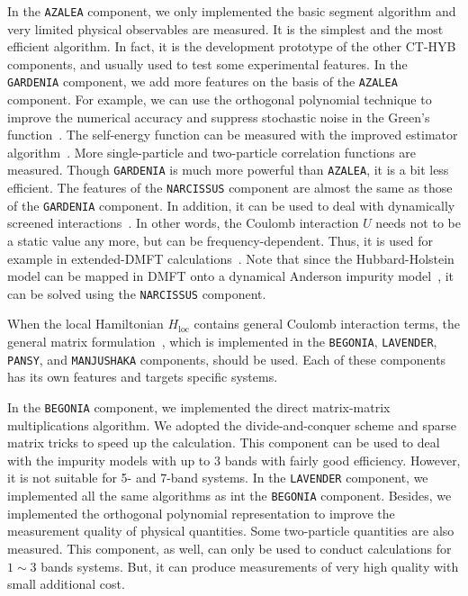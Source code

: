 In the \texttt{AZALEA} component, we only implemented the basic segment algorithm and very limited physical observables are measured. It is the simplest and the most efficient algorithm. In fact, it is the development prototype of the other CT-HYB components, and usually used to test some experimental features. In the \texttt{GARDENIA} component, we add more features on the basis of the \texttt{AZALEA} component. For example, we can use the orthogonal polynomial technique to improve the numerical accuracy and suppress stochastic noise in the Green's function~\cite{PhysRevB.84.075145}. The self-energy function can be measured with the improved estimator algorithm~\cite{PhysRevB.89.235128,PhysRevB.85.205106}. More single-particle and two-particle correlation functions are measured. Though \texttt{GARDENIA} is much more powerful than \texttt{AZALEA}, it is a bit less efficient. The features of the \texttt{NARCISSUS} component are almost the same as those of the \texttt{GARDENIA} component. In addition, it can be used to deal with dynamically screened interactions~\cite{PhysRevLett.104.146401,Werner2012}. In other words, the Coulomb interaction $U$ needs not to be a static value any more, but can be frequency-dependent. Thus, it is used for example in extended-DMFT calculations~\cite{PhysRevB.87.125149}. Note that since the Hubbard-Holstein model can be mapped in DMFT onto a dynamical Anderson impurity model~\cite{PhysRevLett.99.146404}, it can be solved using the \texttt{NARCISSUS} component.

When the local Hamiltonian $H_{\text{loc}}$ contains general Coulomb interaction terms, the general matrix formulation~\cite{PhysRevB.74.155107,PhysRevB.75.155113}, which is implemented in the \texttt{BEGONIA}, \texttt{LAVENDER}, \texttt{PANSY}, and \texttt{MANJUSHAKA} components, should be used. Each of these components has its own features and targets specific systems.

In the \texttt{BEGONIA} component, we implemented the direct matrix-matrix multiplications algorithm. We adopted the divide-and-conquer scheme and sparse matrix tricks to speed up the calculation. This component can be used to deal with the impurity models with up to $3$ bands with fairly good efficiency. However, it is not suitable for 5- and 7-band systems. In the \texttt{LAVENDER} component, we implemented all the same algorithms as int the \texttt{BEGONIA} component. Besides, we implemented the orthogonal polynomial representation to improve the measurement quality of physical quantities. Some two-particle quantities are also measured. This component, as well, can only be used to conduct calculations for $1 \sim 3$ bands systems. But, it can produce measurements of very high quality with small additional cost.

